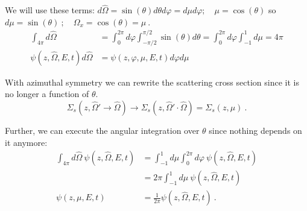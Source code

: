 \documentclass[12pt]{article}
\newcommand{\vOmega}{\ensuremath{\hat{\Omega}}}
\begin{document}
We will use these terms:
$d\vOmega = \sin(\theta) d\theta d\varphi = d\mu d\varphi; \quad \mu = \cos(\theta)$ so $d\mu = \sin(\theta)\:; \quad \Omega_x = \cos(\theta) = \mu\:.$
\begin{align*}
\int_{4 \pi} d\vOmega &= \int_0^{2\pi} d\varphi \int_{-\pi/2}^{\pi/2} \sin(\theta) d\theta =  \int_0^{2\pi} d\varphi \int_{-1}^1 d\mu = 4\pi \\
\psi(z,\vOmega,E,t) d\vOmega &= \psi(z,\varphi, \mu,E,t) d\varphi  d\mu
\end{align*}

With azimuthal symmetry we can rewrite the scattering cross section since it is no longer a function of $\theta$.
\[\Sigma_s(z, \vOmega' \rightarrow \vOmega) \rightarrow \Sigma_s(z, \vOmega' \cdot \vOmega) = \Sigma_s(z, \mu) \:.\]

Further, we can execute the angular integration over $\theta$ since nothing depends on it anymore:
\begin{align*}
\int_{4 \pi} d\vOmega\: \psi(z, \vOmega, E, t) &=   \int_{-1}^1 d\mu \int_0^{2\pi} d\varphi \:\psi(z, \vOmega, E, t) \\
&= 2 \pi \int_{-1}^1 d\mu \:\psi(z, \vOmega, E, t)\\
\psi(z, \mu, E, t) &= \frac{1}{2 \pi}\psi(z, \vOmega, E, t)\:.
\end{align*}



\end{document}
